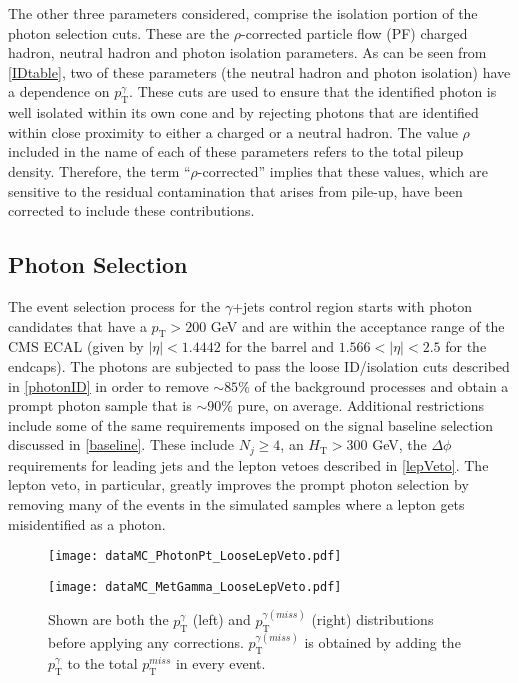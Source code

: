 The other three parameters considered, comprise the isolation portion of the photon selection cuts. These are the $\rho$-corrected particle flow (PF) charged hadron, neutral hadron and photon isolation parameters. As can be seen from \autoref{IDtable}, two of these parameters (the neutral hadron and photon isolation) have a dependence on $p_\text{T}^\gamma$. These cuts are used to ensure that the identified photon is well isolated within its own cone and by rejecting photons that are identified within close proximity to either a charged or a neutral hadron\cite{PFref2}. The value $\rho$ included in the name of each of these parameters refers to the total pileup density\cite{RhoRef}. Therefore, the term ``$\rho$-corrected'' implies that these values, which are sensitive to the residual contamination that arises from pile-up, have been corrected to include these contributions.

\subsection{Photon Selection}\label{photonSelection}
The event selection process for the $\gamma$+jets control region starts with photon candidates that have a $p_\text{T} > 200$ GeV and are within the acceptance range of the CMS ECAL (given by $|\eta| < 1.4442$ for the barrel and $1.566 < |\eta| < 2.5$ for the endcaps). The photons are subjected to pass the loose ID/isolation cuts described in \autoref{photonID} in order to remove $\sim85\%$ of the background processes and obtain a prompt photon sample that is $\sim90\%$ pure, on average. Additional restrictions include some of the same requirements imposed on the signal baseline selection discussed in \autoref{baseline}. These include $N_j \geq 4$, an $H_\text{T} > 300$ GeV, the $\Delta\phi$ requirements for leading jets and the lepton vetoes described in \autoref{lepVeto}. The lepton veto, in particular, greatly improves the prompt photon selection by removing many of the events in the simulated samples where a lepton gets misidentified as a photon.

\begin{figure}[H]
\begin{center}
\begin{minipage}[b]{0.45\textwidth}
    \texttt{[image: dataMC\_PhotonPt\_LooseLepVeto.pdf]}
\end{minipage}
\begin{minipage}[b]{0.45\textwidth}
    \texttt{[image: dataMC\_MetGamma\_LooseLepVeto.pdf]}
\end{minipage}
\end{center}
\vspace{-1em}
\caption{Shown are both the $p_\text{T}^{\gamma}$ (left) and $p_\text{T}^{\gamma (miss)}$ (right) distributions before applying any corrections. $p_\text{T}^{\gamma (miss)}$ is obtained by adding the $p_\text{T}^{\gamma}$ to the total $p_\text{T}^{miss}$ in every event.}
\label{PtMetPt}
\end{figure}
\vspace{1em}


